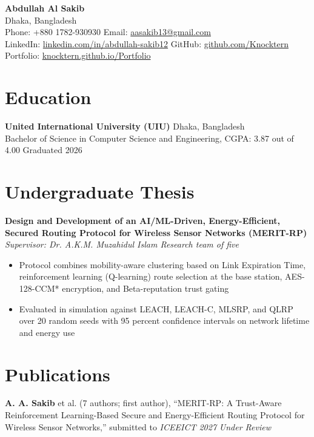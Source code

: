 \documentclass[10pt,a4paper]{article}
\begin{document}
\begin{center}
    {\LARGE \bfseries Abdullah Al Sakib}\\[4pt]
    Dhaka, Bangladesh \\
    Phone: +880 1782-930930 \quad Email: \href{mailto:aasakib13@gmail.com}{aasakib13@gmail.com} \\
    LinkedIn: \href{https://www.linkedin.com/in/abdullah-sakib12}{linkedin.com/in/abdullah-sakib12} \quad
    GitHub: \href{https://github.com/Knocktern}{github.com/Knocktern} \\
    Portfolio: \href{https://knocktern.github.io/Portfolio/}{knocktern.github.io/Portfolio}
\end{center}

\section*{Education}

\textbf{United International University (UIU)} \hfill Dhaka, Bangladesh \\
Bachelor of Science in Computer Science and Engineering, CGPA: 3.87 out of 4.00 \hfill Graduated 2026

\section*{Undergraduate Thesis}

\textbf{Design and Development of an AI/ML-Driven, Energy-Efficient, Secured Routing Protocol for Wireless Sensor Networks (MERIT-RP)} \\
\textit{Supervisor: Dr. A.K.M. Muzahidul Islam \quad Research team of five}
\begin{itemize}
    \item Protocol combines mobility-aware clustering based on Link Expiration Time, reinforcement learning (Q-learning) route selection at the base station, AES-128-CCM* encryption, and Beta-reputation trust gating
    \item Evaluated in simulation against LEACH, LEACH-C, MLSRP, and QLRP over 20 random seeds with 95 percent confidence intervals on network lifetime and energy use
\end{itemize}

\section*{Publications}

\textbf{A. A. Sakib} et al. (7 authors; first author), ``MERIT-RP: A Trust-Aware Reinforcement Learning-Based Secure and Energy-Efficient Routing Protocol for Wireless Sensor Networks,'' submitted to \textit{ICEEICT 2027} \hfill \textit{Under Review}
\end{document}
